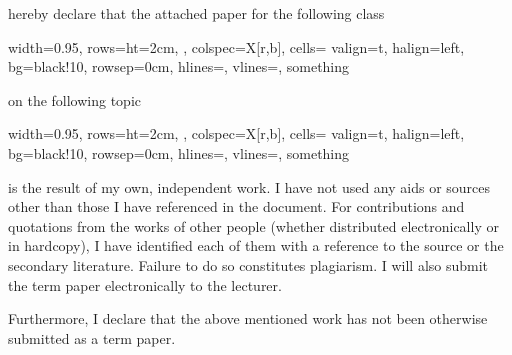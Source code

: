 {\vspace{0.2cm}

hereby declare that the attached paper for the following class

\vspace{-0.3cm}

\begin{center}
    \begin{tblr}{
        width=0.95\linewidth,
        rows={ht=2cm, },
        colspec={X[r,b]},
        cells= {valign=t, halign=left, bg=black!10},
        rowsep=0cm,
        hlines={},
        vlines={},
    }
    something\\
    \end{tblr}
\end{center}


\vspace{-0.1cm}

on the following topic

\vspace{-0.3cm}

\begin{center}
    \begin{tblr}{
        width=0.95\linewidth,
        rows={ht=2cm, },
        colspec={X[r,b]},
        cells= {valign=t, halign=left, bg=black!10},
        rowsep=0cm,
        hlines={},
        vlines={},
    }
    something\\
    \end{tblr}
\end{center}


\vspace{0.3cm}


is the result of my own, independent work. I have not used any aids or sources other than those I have referenced in the document. For contributions and quotations from the works of other people (whether distributed electronically or in hardcopy), I have identified each of them with a reference to the source or the secondary literature. Failure to do so constitutes plagiarism. I will also submit the term paper electronically to the lecturer.\\

\vspace{\baselineskip}

Furthermore, I declare that the above mentioned work has not been
otherwise submitted as a term paper.\\

\vspace{\baselineskip}

}
